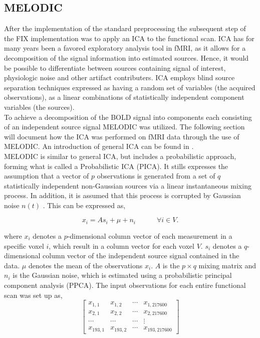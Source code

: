 \subsection{MELODIC}

After the implementation of the standard preprocessing the subsequent step of the FIX implementation was to apply an ICA to the functional scan. ICA has for many years been a favored exploratory analysis tool in fMRI, as it allows for a decomposition of the signal information into estimated sources. Hence, it would be possible to differentiate between sources containing signal of interest, physiologic noise and other artifact contributers. ICA employs blind source separation techniques expressed as having a random set of variables (the acquired observations), as a linear combinations of statistically independent component variables (the sources). \cite{Beckmann2004} \\
To achieve a decomposition of the BOLD signal into components each consisting of an independent source signal MELODIC was utilized. The following section will document how the ICA was performed on fMRI data through the use of MELODIC. An introduction of general ICA can be found in . \\
MELODIC is similar to general ICA, but includes a probabilistic approach, forming what is called a Probabilistic ICA (PICA). It stills expresses the assumption that a vector of $p$ observations is generated from a set of $q$ statistically independent non-Gaussian sources via a linear instantaneous mixing process. In addition, it is assumed that this process is corrupted by Gaussian noise $n(t)$ \cite{Beckmann2004}. This can be expressed as, 

\begin{equation}
x_i = As_i + \mu + n_i  \hspace{3em} \forall i \in V.
\end{equation}     

where $x_i$ denotes a $p$-dimensional column vector of each measurement in a specific voxel $i$, which result in a column vector for each voxel $V$. $s_i$ denotes a $q$-dimensional column vector of the independent source signal contained in the data. $\mu$ denotes the mean of the observations $x_i$. $A$ is the $p\times q$ mixing matrix and $n_i$ is the Gaussian noise, which is estimated using a probabilistic principal component analysis (PPCA). The input observations for each entire functional scan was set up as,
\begin{equation}
 \begin{bmatrix}
x_{1,1} & x_{1,2} & \cdots & x_{1,217600} \\
x_{2,1} & x_{2,2} & \cdots & x_{2,217600} \\
\cdots & \cdots & \cdots & \vdots \\
x_{193,1} & x_{193,2} & \cdots & x_{193,217600} 
\end{bmatrix}  
\end{equation}

